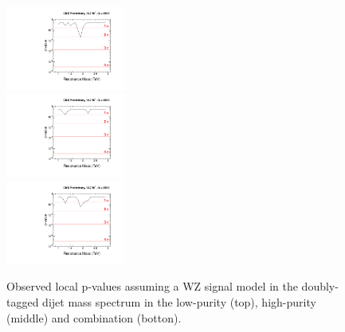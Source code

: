 \begin{figure}[h!tpb]
\begin{center}
\includegraphics[width=0.35\textwidth]{figs/limits/pvalue_WZ_low_purity.pdf}\\
\includegraphics[width=0.35\textwidth]{figs/limits/pvalue_WZ_high_purity.pdf}\\
\includegraphics[width=0.35\textwidth]{figs/limits/pvalue_WZ_combined.pdf}
\end{center}
\caption{Observed local p-values assuming a WZ signal model in the doubly-tagged dijet mass spectrum in the low-purity (top), high-purity (middle) and combination (botton).}
\label{fig:Vtagresults6}
\end{figure}

